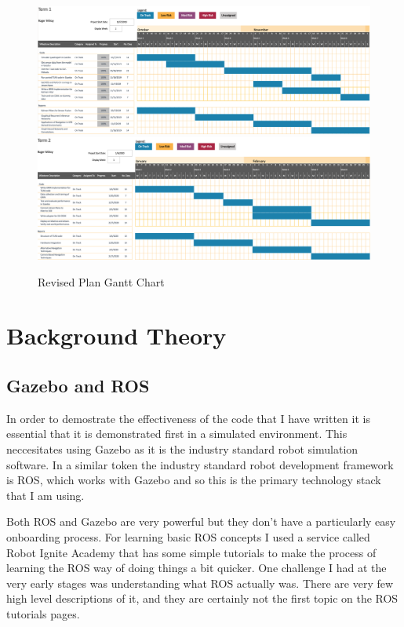 \documentclass[]{../resources/final_report}
\begin{document}
\begin{figure}[h]
  \centering
  \includegraphics[width=\textwidth]{Term1GanttChart.png}
  \includegraphics[width=\textwidth]{Term2GanttChart.png}
  \caption{Revised Plan Gantt Chart}
  \label{}
\end{figure}

\chapter{Background Theory}

\section{Gazebo and ROS}

In order to demostrate the effectiveness of the code that I have written it is essential that it is demonstrated first in a simulated environment. This neccesitates using Gazebo as it is the industry standard robot simulation software. In a similar token the industry standard robot development framework is ROS, which works with Gazebo and so this is the primary technology stack that I am using.

Both ROS and Gazebo are very powerful but they don't have a particularly easy onboarding process. For learning basic ROS concepts I used a service called Robot Ignite Academy that has some simple tutorials to make the process of learning the ROS way of doing things a bit quicker. One challenge I had at the very early stages was understanding what ROS actually was. There are very few high level descriptions of it, and they are certainly not the first topic on the ROS tutorials pages.
\end{document}
